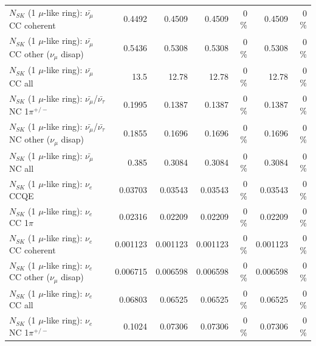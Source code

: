 \begin{table}
\begin{tabular}{| l | r | r | r  r | r  r |}
                       $N_{SK}$ (1 $\mu$-like ring): $\bar{\nu_\mu}$ CC coherent &          0.4492 &          0.4509 &          0.4509 &        0 \%  &          0.4509 &        0 \%  \\ 
        $N_{SK}$ (1 $\mu$-like ring): $\bar{\nu_\mu}$ CC other ($\nu_\mu$ disap) &          0.5436 &          0.5308 &          0.5308 &        0 \%  &          0.5308 &        0 \%  \\ 
                          $N_{SK}$ (1 $\mu$-like ring): $\bar{\nu_{\mu}}$ CC all &            13.5 &           12.78 &           12.78 &        0 \%  &           12.78 &        0 \%  \\ 
\hline
  $N_{SK}$ (1 $\mu$-like ring): $\bar{\nu_\mu}$/$\bar{\nu_\tau}$ NC 1$\pi^{+/-}$ &          0.1995 &          0.1387 &          0.1387 &        0 \%  &          0.1387 &        0 \%  \\ 
$N_{SK}$ (1 $\mu$-like ring): $\bar{\nu_\mu}$/$\bar{\nu_\tau}$ NC other ($\nu_\mu$ disap) &          0.1855 &          0.1696 &          0.1696 &        0 \%  &          0.1696 &        0 \%  \\ 
                          $N_{SK}$ (1 $\mu$-like ring): $\bar{\nu_{\mu}}$ NC all &           0.385 &          0.3084 &          0.3084 &        0 \%  &          0.3084 &        0 \%  \\ 
\hline
\hline
\hline
                                      $N_{SK}$ (1 $\mu$-like ring): $\nu_e$ CCQE &         0.03703 &         0.03543 &         0.03543 &        0 \%  &         0.03543 &        0 \%  \\ 
                                 $N_{SK}$ (1 $\mu$-like ring): $\nu_e$ CC 1$\pi$ &         0.02316 &         0.02209 &         0.02209 &        0 \%  &         0.02209 &        0 \%  \\ 
                               $N_{SK}$ (1 $\mu$-like ring): $\nu_e$ CC coherent &        0.001123 &        0.001123 &        0.001123 &        0 \%  &        0.001123 &        0 \%  \\ 
                $N_{SK}$ (1 $\mu$-like ring): $\nu_e$ CC other ($\nu_\mu$ disap) &        0.006715 &        0.006598 &        0.006598 &        0 \%  &        0.006598 &        0 \%  \\ 
                                  $N_{SK}$ (1 $\mu$-like ring): $\nu_{e}$ CC all &         0.06803 &         0.06525 &         0.06525 &        0 \%  &         0.06525 &        0 \%  \\ 
\hline
                           $N_{SK}$ (1 $\mu$-like ring): $\nu_e$ NC 1$\pi^{+/-}$ &          0.1024 &         0.07306 &         0.07306 &        0 \%  &         0.07306 &        0 \%  \\ 

\end{tabular}
\end{table}
